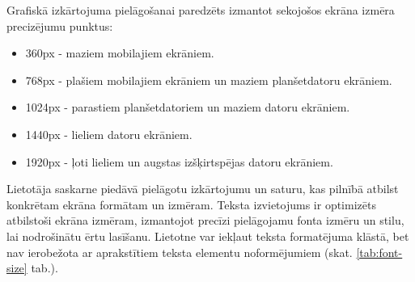 Grafiskā izkārtojuma pielāgošanai paredzēts izmantot sekojošos ekrāna izmēra precizējumu punktus:
\begin{itemize}
	\item 360px - maziem mobilajiem ekrāniem.
	\item 768px - plašiem mobilajiem ekrāniem un maziem planšetdatoru ekrāniem.
	\item 1024px - parastiem planšetdatoriem un maziem datoru ekrāniem.
	\item 1440px - lieliem datoru ekrāniem.
	\item 1920px - ļoti lieliem un augstas izšķirtspējas datoru ekrāniem.
\end{itemize}

Lietotāja saskarne piedāvā pielāgotu izkārtojumu un saturu, kas pilnībā atbilst konkrētam ekrāna formātam un izmēram.
Teksta izvietojums ir optimizēts atbilstoši ekrāna izmēram, izmantojot precīzi pielāgojamu fonta izmēru un stilu, lai nodrošinātu ērtu lasīšanu.
Lietotne var iekļaut teksta formatējuma klāstā, bet nav ierobežota ar aprakstītiem teksta elementu noformējumiem (skat. \ref{tab:font-size} tab.).


